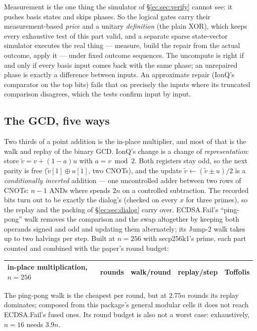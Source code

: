 Measurement is the one thing the simulator of \S\ref{ec:sec:verify} cannot see: it pushes basis
states and skips phases. So the logical gates carry their measurement-based \emph{price} and a
unitary \emph{definition} (the plain XOR), which keeps every exhaustive test of this part valid, and
a separate sparse state-vector simulator executes the real thing --- measure, build the repair from
the actual outcome, apply it --- under fixed outcome sequences. The uncompute is right if and only
if every basis input comes back with the same phase; an unrepaired phase is exactly a difference
between inputs. An approximate repair (IonQ's comparator on the top bits) fails that on precisely
the inputs where its truncated comparison disagrees, which the tests confirm input by input.

\subsection{The GCD, five ways}

Two thirds of a point addition is the in-place multiplier, and most of that is the walk and replay
of the binary GCD. IonQ's change is a change of \emph{representation}: store $\tilde v=v+(1-a)u$ with
$a=v\bmod2$. Both registers stay odd, so the next parity is free ($\tilde v[1]\oplus u[1]$, two
CNOTs), and the update $\tilde v\leftarrow(\tilde v\pm u)/2$ is a \emph{conditionally inverted}
addition --- one uncontrolled adder between two rows of CNOTs:
\noindent $n-1$ ANDs where \cite{ec:schrott26} spends $2n$ on a controlled subtraction. The recorded
bits turn out to be exactly the dialog's (checked on every $x$ for three primes), so the replay and
the packing of \S\ref{ec:sec:dialog} carry over. ECDSA.Fail's ``ping-pong'' walk removes the comparison
and the swap altogether by keeping both operands signed and odd and updating them alternately; its
Jump-2 walk takes up to two halvings per step. Built at $n=256$ with secp256k1's prime, each part
counted and combined with the paper's round budget:

\begin{center}\small
\begin{tabular}{lrrrr}
\toprule
in-place multiplication, $n=256$ & rounds & walk/round & replay/step & Toffolis\\
\midrule
\bottomrule
\end{tabular}
\end{center}

The ping-pong walk is the cheapest per round, but at $2.75n$ rounds its replay dominates; composed
from this package's general modular cells it does not reach ECDSA.Fail's fused ones. Its round
budget is also not a worst case: exhaustively, $n=16$ needs $3.9n$.

